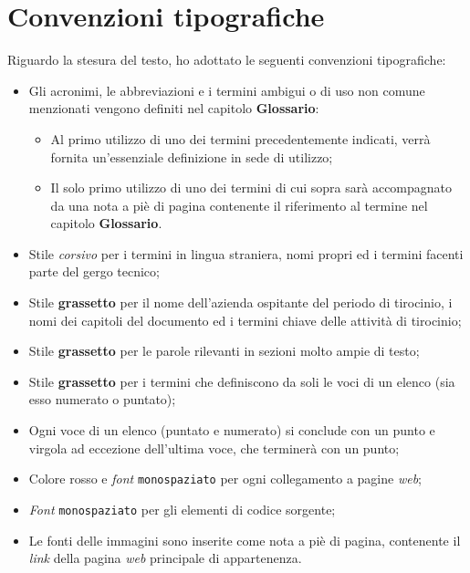 \section*{Convenzioni tipografiche}
Riguardo la stesura del testo, ho adottato le seguenti convenzioni tipografiche:
\begin{itemize}
	\item Gli acronimi, le abbreviazioni e i termini ambigui o di uso non comune menzionati vengono definiti nel capitolo \textbf{Glossario}:
        \begin{itemize}
            \item Al primo utilizzo di uno dei termini precedentemente indicati, verrà fornita un'essenziale definizione in sede di utilizzo;
            \item Il solo primo utilizzo di uno dei termini di cui sopra sarà accompagnato da una nota a piè di pagina contenente il riferimento al termine nel capitolo \textbf{Glossario}.
        \end{itemize} 
	\item Stile \textit{corsivo} per i termini in lingua straniera, nomi propri ed i termini facenti parte del gergo tecnico;
	\item Stile \textbf{grassetto} per il nome dell'azienda ospitante del periodo di tirocinio, i nomi dei capitoli del documento ed i termini chiave delle attività di tirocinio;
	\item Stile \textbf{grassetto} per le parole rilevanti in sezioni molto ampie di testo;
	\item Stile \textbf{grassetto} per i termini che definiscono da soli le voci di un elenco (sia esso numerato o puntato);
	\item Ogni voce di un elenco (puntato e numerato) si conclude con un punto e virgola ad eccezione dell'ultima voce, che terminerà con un punto;
	\item Colore rosso e \textit{font} \texttt{monospaziato} per ogni collegamento a pagine \textit{web};
	\item \textit{Font} \texttt{monospaziato} per gli elementi di codice sorgente;
	\item Le fonti delle immagini sono inserite come nota a piè di pagina, contenente il \textit{link} della pagina \textit{web} principale di appartenenza.
\end{itemize}



\endgroup

\vfill
